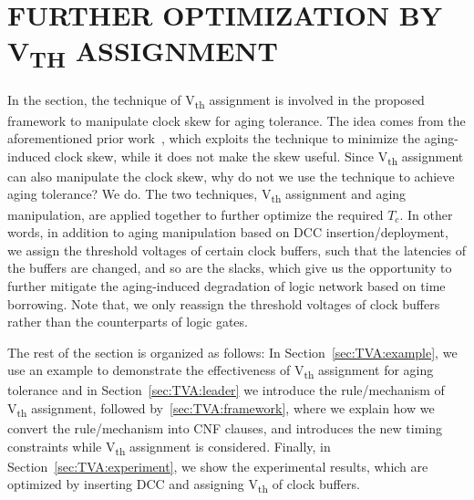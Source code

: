  \section{FURTHER OPTIMIZATION BY V\textsubscript{TH} ASSIGNMENT}
\label{sec:TVA}
In the section, the technique of V\textsubscript{th} assignment is involved in the proposed framework to manipulate clock skew for aging tolerance. The idea comes from the aforementioned prior work~\cite{chen2013novel}, which exploits the technique to minimize the aging-induced clock skew, while it does not make the skew useful. Since V\textsubscript{th} assignment can also manipulate the clock skew, why do not we use the technique to achieve aging tolerance? We do. The two techniques,  V\textsubscript{th} assignment and aging manipulation, are applied together to further optimize the required $T_c$. In other words, in addition to aging manipulation based on DCC insertion/deployment, we assign the threshold voltages of certain clock buffers, such that the latencies of the buffers are changed, and so are the slacks, which give us the opportunity to further mitigate the aging-induced degradation of logic network based on time borrowing. Note that, we only reassign the threshold voltages of clock buffers rather than the counterparts of logic gates. 

The rest of the section is organized as follows: In Section~\ref{sec:TVA:example}, we use an example to demonstrate the effectiveness of V\textsubscript{th} assignment for aging tolerance and in Section~\ref{sec:TVA:leader} we introduce the rule/mechanism of V\textsubscript{th} assignment, followed by~\ref{sec:TVA:framework}, where we explain how we convert the rule/mechanism into CNF clauses, and  introduces the new timing constraints while V\textsubscript{th} assignment is considered. Finally, in Section~\ref{sec:TVA:experiment}, we show the experimental results, which are optimized by inserting DCC and assigning V\textsubscript{th} of clock buffers.
